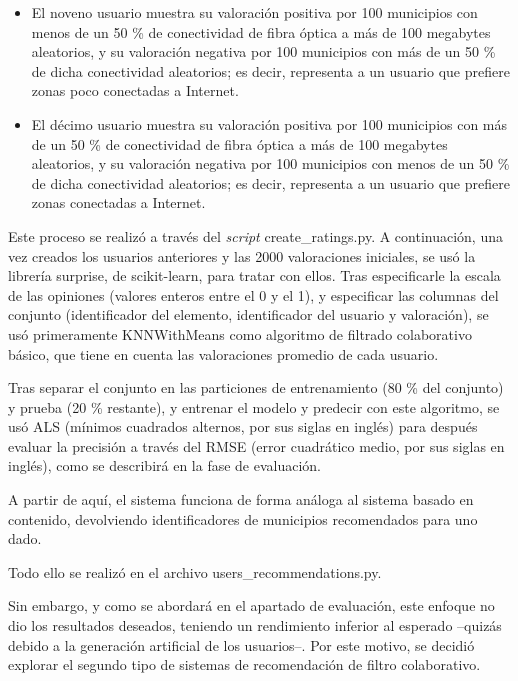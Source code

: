 \begin{itemize}
    \item El noveno usuario muestra su valoración positiva por 100 municipios con menos de un 50 \% de conectividad de fibra óptica a más de 100 megabytes aleatorios, y su valoración negativa por 100 municipios con más de un 50 \% de dicha conectividad aleatorios; es decir, representa a un usuario que prefiere zonas poco conectadas a Internet.

    \item El décimo usuario muestra su valoración positiva por 100 municipios con más de un 50 \% de conectividad de fibra óptica a más de 100 megabytes aleatorios, y su valoración negativa por 100 municipios con menos de un 50 \% de dicha conectividad aleatorios; es decir, representa a un usuario que prefiere zonas conectadas a Internet.

\end{itemize}

Este proceso se realizó a través del \textit{script} create\_ratings.py. A continuación, una vez creados los usuarios anteriores y las 2000 valoraciones iniciales, se usó la librería surprise, de scikit-learn, para tratar con ellos. Tras especificarle la escala de las opiniones (valores enteros entre el 0 y el 1), y especificar las columnas del conjunto (identificador del elemento, identificador del usuario y valoración), se usó primeramente KNNWithMeans como algoritmo de filtrado colaborativo básico, que tiene en cuenta las valoraciones promedio de cada usuario.

Tras separar el conjunto en las particiones de entrenamiento (80 \% del conjunto) y prueba (20 \% restante), y entrenar el modelo y predecir con este algoritmo, se usó ALS (mínimos cuadrados alternos, por sus siglas en inglés) para después evaluar la precisión a través del RMSE (error cuadrático medio, por sus siglas en inglés), como se describirá en la fase de evaluación.

A partir de aquí, el sistema funciona de forma análoga al sistema basado en contenido, devolviendo identificadores de municipios recomendados para uno dado.

Todo ello se realizó en el archivo users\_recommendations.py.

Sin embargo, y como se abordará en el apartado de evaluación, este enfoque no dio los resultados deseados, teniendo un rendimiento inferior al esperado –quizás debido a la generación artificial de los usuarios–. Por este motivo, se decidió explorar el segundo tipo de sistemas de recomendación de filtro colaborativo.


